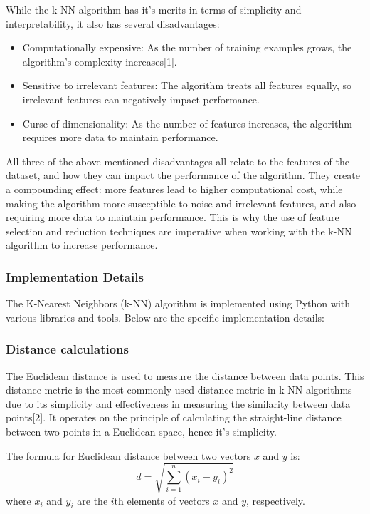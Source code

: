 While the k-NN algorithm has it's merits in terms of simplicity and interpretability, it also has several disadvantages:
\begin{itemize}
    \item Computationally expensive: As the number of training examples grows, the algorithm's complexity increases[1]. 
    \item Sensitive to irrelevant features: The algorithm treats all features equally, so irrelevant features can negatively impact performance.
    \item Curse of dimensionality: As the number of features increases, the algorithm requires more data to maintain performance.
\end{itemize}

All three of the above mentioned disadvantages all relate to the features of the dataset, and how they can impact the performance of the algorithm.
They create a compounding effect: more features lead to higher computational cost, while making the algorithm more susceptible to noise and irrelevant features,
and also requiring more data to maintain performance. This is why the use of feature selection and reduction techniques are imperative 
when working with the k-NN algorithm to increase performance.


\subsubsection{Implementation Details}
The K-Nearest Neighbors (k-NN) algorithm is implemented using Python with various libraries and tools.
Below are the specific implementation details:

\subsubsection*{Distance calculations}
The Euclidean distance is used to measure the distance between data points. 
This distance metric is the most commonly used distance metric in k-NN algorithms
due to its simplicity and effectiveness in measuring the similarity between data points[2].
It operates on the principle of calculating the straight-line distance between two points in a Euclidean space, hence it's simplicity.

The formula for Euclidean distance between two vectors \(x\) and \(y\) is:
\[ d = \sqrt{\sum_{i=1}^{n} (x_i - y_i)^2} \]
where \(x_i\) and \(y_i\) are the \(i\)th elements of vectors \(x\) and \(y\), respectively.\\

